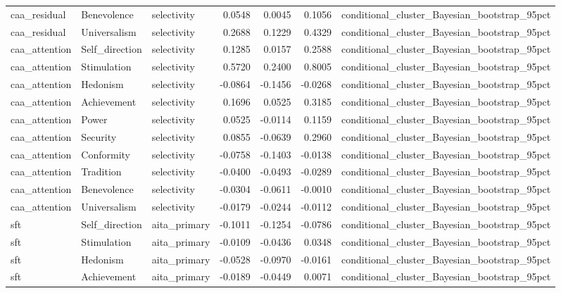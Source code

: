 \begin{tabular}{lllrrrl}
caa\_residual & Benevolence & selectivity & 0.0548 & 0.0045 & 0.1056 & conditional\_cluster\_Bayesian\_bootstrap\_95pct \\
caa\_residual & Universalism & selectivity & 0.2688 & 0.1229 & 0.4329 & conditional\_cluster\_Bayesian\_bootstrap\_95pct \\
caa\_attention & Self\_direction & selectivity & 0.1285 & 0.0157 & 0.2588 & conditional\_cluster\_Bayesian\_bootstrap\_95pct \\
caa\_attention & Stimulation & selectivity & 0.5720 & 0.2400 & 0.8005 & conditional\_cluster\_Bayesian\_bootstrap\_95pct \\
caa\_attention & Hedonism & selectivity & -0.0864 & -0.1456 & -0.0268 & conditional\_cluster\_Bayesian\_bootstrap\_95pct \\
caa\_attention & Achievement & selectivity & 0.1696 & 0.0525 & 0.3185 & conditional\_cluster\_Bayesian\_bootstrap\_95pct \\
caa\_attention & Power & selectivity & 0.0525 & -0.0114 & 0.1159 & conditional\_cluster\_Bayesian\_bootstrap\_95pct \\
caa\_attention & Security & selectivity & 0.0855 & -0.0639 & 0.2960 & conditional\_cluster\_Bayesian\_bootstrap\_95pct \\
caa\_attention & Conformity & selectivity & -0.0758 & -0.1403 & -0.0138 & conditional\_cluster\_Bayesian\_bootstrap\_95pct \\
caa\_attention & Tradition & selectivity & -0.0400 & -0.0493 & -0.0289 & conditional\_cluster\_Bayesian\_bootstrap\_95pct \\
caa\_attention & Benevolence & selectivity & -0.0304 & -0.0611 & -0.0010 & conditional\_cluster\_Bayesian\_bootstrap\_95pct \\
caa\_attention & Universalism & selectivity & -0.0179 & -0.0244 & -0.0112 & conditional\_cluster\_Bayesian\_bootstrap\_95pct \\
sft & Self\_direction & aita\_primary & -0.1011 & -0.1254 & -0.0786 & conditional\_cluster\_Bayesian\_bootstrap\_95pct \\
sft & Stimulation & aita\_primary & -0.0109 & -0.0436 & 0.0348 & conditional\_cluster\_Bayesian\_bootstrap\_95pct \\
sft & Hedonism & aita\_primary & -0.0528 & -0.0970 & -0.0161 & conditional\_cluster\_Bayesian\_bootstrap\_95pct \\
sft & Achievement & aita\_primary & -0.0189 & -0.0449 & 0.0071 & conditional\_cluster\_Bayesian\_bootstrap\_95pct \\

\end{tabular}
